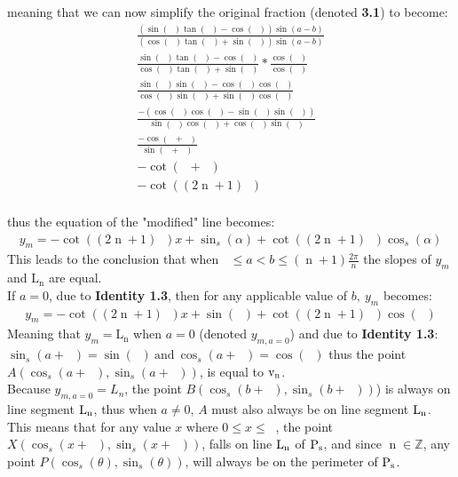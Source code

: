 \documentclass[11pt]{article}
\DeclareMathOperator{\custi}{\mathrm{n}}
\DeclareMathOperator{\period}{\frac{2\pi}{s}}
\DeclareMathOperator{\hp}{\frac{\pi}{s}}
\DeclareMathOperator{\iperiod}{\custi\frac{2\pi}{s}}
\begin{document}
meaning that we can now simplify the original fraction (denoted \textbf{3.1}) to become:
\begin{gather*}
\frac{(\sin(\iperiod)\tan(\hp)-\cos(\iperiod))\sin(a-b)}{(\cos(\iperiod)\tan(\hp)+\sin(\iperiod))\sin(a-b)}\\
\frac{\sin(\iperiod)\tan(\hp)-\cos(\iperiod)}{\cos(\iperiod)\tan(\hp)+\sin(\iperiod)} * \frac{\cos(\hp)}{\cos(\hp)}\\
\frac{\sin(\iperiod)\sin(\hp)-\cos(\iperiod)\cos(\hp)}{\cos(\iperiod)\sin(\hp)+\sin(\iperiod)\cos(\hp)}\\
\frac{-(\cos(\iperiod)\cos(\hp)-\sin(\iperiod)\sin(\hp))}{\sin(\hp)\cos(\iperiod)+\cos(\hp)\sin(\iperiod)}\\
\frac{-\cos(\iperiod+\hp)}{\sin(\iperiod+\hp)}\\
-\cot(\iperiod+\hp)\\
-\cot((2\custi+1)\hp)
\end{gather*}
\fi\\
thus the equation of the "modified" line becomes:
\begin{gather*}
y_m=-\cot((2\custi+1)\hp)x+\sin_s(\alpha)+\cot((2\custi+1)\hp)\cos_s(\alpha)
\end{gather*}
This leads to the conclusion that when \(\iperiod\leq a<b\leq(\custi+1)\frac{2\pi}{n}\) the slopes of \(y_m\) and \(\mathrm{L_n}\) are equal. \\
If \(a=0\), due to \textbf{Identity 1.3}, then for any applicable value of \(b,\ y_m\) becomes:
\begin{gather*}
y_m=-\cot((2\custi+1)\hp)x+\sin(\iperiod)+\cot((2\custi+1)\hp)\cos(\iperiod)
\end{gather*}
Meaning that \(y_m=\mathrm{L_n}\) when \(a=0\) (denoted \(y_{m,a=0}\)) and due to \textbf{Identity 1.3}: \(\sin_s(a+\iperiod)=\sin(\iperiod) \mathrm{\ and\ } \cos_s(a+\iperiod)=\cos(\iperiod)\) thus the point \(A(\cos_s(a+\iperiod), \sin_s(a+\iperiod))\), is equal to \(\rm v_n\).\\
Because \(y_{m,a=0} = L_n\), the point \(B(\cos_s(b+\iperiod),\sin_s(b+\iperiod))\)) is always on line segment \(\rm L_n\), thus when \(a\neq0\), \(A\) must also always be on line segment \(\rm L_n\).\\
This means that for any value \(x\) where \(0\leq x \leq\period\), the point \(X(\cos_s(x+\iperiod),\sin_s(x+\iperiod))\), falls on line \(\rm L_n\) of \(\rm P_s\), and since \(\custi\in\mathbb{Z}\), any point \(P(\cos_s(\theta),\sin_s(\theta))\), will always be on the perimeter of \(\rm P_s\).

\pagebreak

\printbibliography
\end{document}
